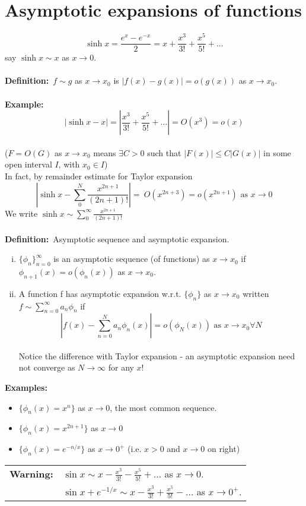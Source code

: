 \documentclass{article}
\newcommand{\definition}{\textbf{Definition:}}
\newcommand{\example}{\textbf{Example:}}
\newcommand{\examples}{\textbf{Examples:}}
\begin{document}
\section{Asymptotic expansions of functions}
\[ \sinh x = \frac{e^x - e^{-x}}{2} = x + \frac{x^3}{3!} + \frac{x^5}{5!} + \dots\]
say $\sinh x \sim x$ as $x \to 0$.
\\
\\
\definition\ $f \sim g$ as $x \to x_0$ is $|f(x) - g(x)| = o(g(x))$ as $x \to x_0$.
\\
\\
\example 
\[|\sinh x - x| = |\frac{x^3}{3!} + \frac{x^5}{5!} + \dots| = O(x^3) = o(x)\]
\\
($F=O(G)$ as $x \to x_0$ means $\exists C>0$ such that $|F(x)| \leq C|G(x)|$ in
some open interval $I$, with $x_0 \in I$)
\\
In fact, by remainder estimate for Taylor expansion
\[ \left| \sinh x - \sum_{0}^{N} \frac{x^{2n+1}}{(2n+1)!} \right| = \
O(x^{2n+3}) = o(x^{2n+1}) \mbox{ as } x \to 0\]
We write $\displaystyle \sinh x \sim \sum_{0}^{\infty} \frac{x^{2n+1}}{(2n+1)!}$
\\
\\
\definition\ Asymptotic sequence and asymptotic expansion.
\begin{enumerate}[(i)]
\item $\{\phi_n\}_{n=0}^{\infty}$ is an asymptotic sequence (of functions) as 
		$x \to x_0$ if $\phi_{n+1}(x) = o(\phi_n(x))$ as $x \to x_0$. 
\item A function f has asymptotic expansion w.r.t. $\{ \phi_n\}$ as $x \to x_0$ 
		written $f \sim \sum_{n=0}^{\infty} a_n \phi_n$ if 
		\[ \left| f(x) - \sum_{n=0}^N a_n \phi_n(x) \right| = o(\phi_N(x)) \mbox{ as }
		 x \to x_0 \forall N\]
		\\
		Notice the difference with Taylor expansion - an asymptotic expansion 
		need not converge as $N\to \infty$ for any $x$!
\end{enumerate}
\examples\ 
\begin{itemize}
\item $\{ \phi_n(x) = x^n \}$ as $x \to 0$, the most common sequence.
\item $\{ \phi_n(x) = x^{2n+1} \}$ as $x \to 0$
\item $\{ \phi_n(x) = e^{-n/x} \}$ as $x \to 0^+$ (i.e. $x>0$ and $x\to 0$ on right)
\end{itemize}
%
%
\begin{framed}
\noindent \begin{tabular}{cl} 
\textbf{Warning:} & $\displaystyle \sin x \sim x - \frac{x^3}{3!} -
\frac{x^5}{5!} + \dots$ as $x \to 0$. \\
& $\displaystyle \sin x + e^{-1/x} \sim x  - \frac{x^3}{3!} + \frac{x^5}{5!}
 - \dots$ as $x \to 0^{+}$. 
\end{tabular}
\end{framed}
\end{document}

